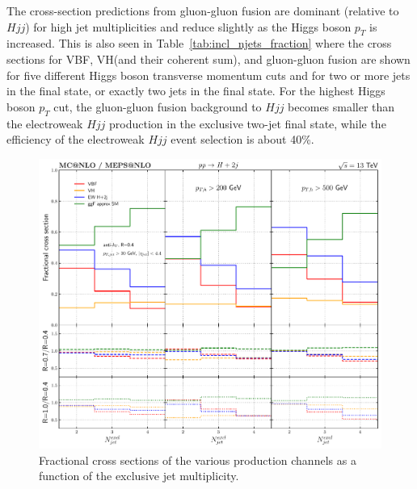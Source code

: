 \documentclass[10pt,prd,fleqn,superscriptaddress,notitlepage,nofootinbib,preprintnumbers,nobalancelastpage]{revtex4-1}
\newcommand{\VBF}{VBF\xspace}
\newcommand{\VH}{VH\xspace}
\begin{document}
The cross-section predictions from gluon-gluon fusion are dominant (relative to $Hjj$) for high jet multiplicities and reduce slightly as the Higgs boson $p_T$ is increased.
This is also seen in Table~\ref{tab:incl_njets_fraction} where the cross sections for \VBF, \VH (and their coherent sum), and gluon-gluon fusion are shown for five different Higgs boson transverse momentum cuts and for two or more jets in the final state, or exactly two jets in the final state.
For the highest Higgs boson $p_T$ cut, the gluon-gluon fusion background to $Hjj$ becomes smaller than the electroweak $Hjj$ production in the exclusive two-jet final state, while the efficiency of the electroweak $Hjj$ event selection is about 40\%.



\begin{figure}[p]
  \centering
  \includegraphics[width=.6\textwidth]{figures/vbf/njets.pdf}
\caption{Fractional cross sections of the various production channels as a function of the exclusive jet multiplicity. }
\label{fig:incl_njets_fraction}
\end{figure}
\end{document}
